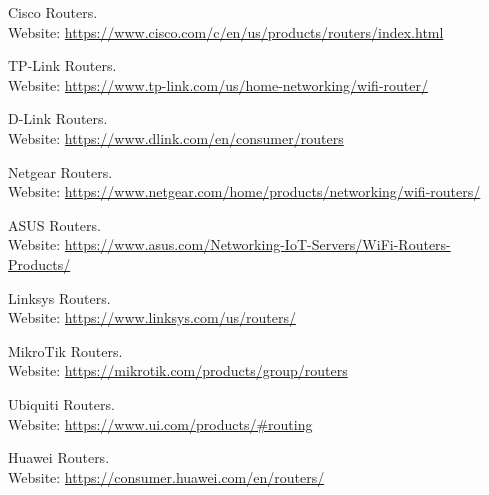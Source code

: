 \documentclass[11pt]{article}
\begin{document}
\begin{thebibliography}{99}
    Cisco Routers. \\
    Website: \url{https://www.cisco.com/c/en/us/products/routers/index.html}
  
    TP-Link Routers. \\
    Website: \url{https://www.tp-link.com/us/home-networking/wifi-router/}
  
    D-Link Routers. \\
    Website: \url{https://www.dlink.com/en/consumer/routers}
  
    Netgear Routers. \\
    Website: \url{https://www.netgear.com/home/products/networking/wifi-routers/}
  
    ASUS Routers. \\
    Website: \url{https://www.asus.com/Networking-IoT-Servers/WiFi-Routers-Products/}
  
    Linksys Routers. \\
    Website: \url{https://www.linksys.com/us/routers/}
  
    MikroTik Routers. \\
    Website: \url{https://mikrotik.com/products/group/routers}
  
    Ubiquiti Routers. \\
    Website: \url{https://www.ui.com/products/#routing}
  
    Huawei Routers. \\
    Website: \url{https://consumer.huawei.com/en/routers/}
  \end{thebibliography}
\end{document}
